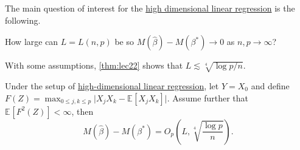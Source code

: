 The main question of interest for the \hyperref[eg:high-dim-LR]{high dimensional linear regression} is the following.

\begin{problem*}[Persistency]
	How large can \(L = L(n, p)\) be so \(M(\hat{\beta} ) - M(\beta ^{\ast} ) \to 0\) as \(n, p \to \infty \)?
\end{problem*}
\begin{answer}
	With some assumptions, \autoref{thm:lec22} shows that \(L \lesssim \sqrt[4]{\log p / n} \).
\end{answer}

\begin{theorem}\label{thm:lec22}
	Under the setup of \hyperref[eg:high-dim-LR]{high-dimensional linear regression}, let \(Y = X_0\) and define \(F(Z) = \max _{0 \leq j, k \leq p} \vert X_j X_k - \mathbb{E}_{}\left[X_j X_k \right] \vert \). Assume further that \(\mathbb{E}_{}\left[F^2(Z) \right] < \infty \), then
	\[
		M(\hat{\beta} ) - M(\beta ^{\ast} ) = O_p \left( L , \sqrt[4]{\frac{\log p}{n}} \right).
	\]
\end{theorem}
